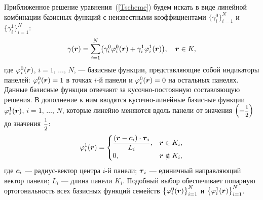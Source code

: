 \documentclass[12pt, a4paper]{article}
\renewcommand{\vec}[1]{\text{\mathversion{bold}${#1}$}}%
\begin{document}
Приближенное решение уравнения~(\ref{Tscheme}) будем искать в виде линейной комбинации базисных функций с неизвестными коэффициентами $\{\gamma_i^0\}_{i=1}^N$ и $\{\gamma_i^1\}_{i=1}^N$:
\begin{equation}
\label{gamma1}
\gamma(\vec r) = \sum_{i=1}^N \bigl(\gamma_i^0 \varphi_i^0(\vec r) + \gamma_i^1 \varphi_i^1(\vec r)\bigr), \quad \vec r \in K,
\end{equation}
где $\varphi_i^0(\vec r)$, $i=1,\,\ldots,\,N$, --- базисные функции, представляющие собой индикаторы панелей: $\varphi_i^0(\vec r) = 1$ в точках $i$-й панели и $\varphi_i^0(\vec r) = 0$ на остальных панелях. Данные базисные функции отвечают за кусочно-постоянную составляющую решения. В дополнение к ним вводятся кусочно-линейные базисные функции $ \varphi_i^1(\vec r)$, $i=1,\,\ldots,\,N$, которые линейно меняются вдоль панели от значения $\Bigl(-\hbox{\footnotesize$\displaystyle\frac{1}{2}$}\Bigr)$ до значения $\hbox{\footnotesize$\displaystyle\frac{1}{2}$}$:
\begin{equation}
\label{basys1}
\varphi_i^1(\vec r) =
\begin{cases}
\dfrac{(\vec r - \vec c_i) \cdot \vec \tau_i} {L_i}, & \vec r \in K_i,\\
0, & \vec r \notin  K_i,
\end{cases}
\end{equation}
где $\vec c_i$ --- радиус-вектор центра $i$-й панели; $\vec\tau_i$ --- единичный направляющий вектор панели; $L_i$ --- длина панели $K_i$. Подобный выбор обеспечивает попарную ортогональность всех базисных функций семейств $\bigl\{\varphi_i^0(\vec r)\bigr\}_{i=1}^N$ и $\bigl\{\varphi_i^1(\vec r)\bigr\}_{i=1}^N$.
\end{document}
